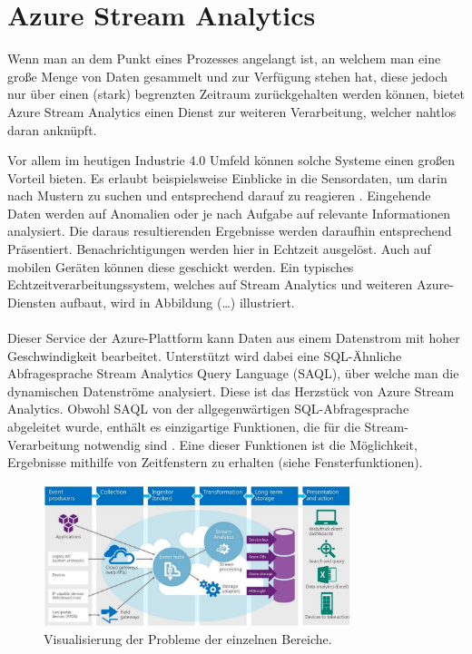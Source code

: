 \section{Azure Stream Analytics}
Wenn man an dem Punkt eines Prozesses angelangt ist, an welchem man eine große Menge von Daten gesammelt und zur Verfügung stehen hat, diese jedoch nur über einen (stark) begrenzten Zeitraum zurückgehalten werden können, bietet Azure Stream Analytics einen Dienst zur weiteren Verarbeitung, welcher nahtlos daran anknüpft. 


Vor allem im heutigen Industrie 4.0 Umfeld können solche Systeme einen großen Vorteil bieten. Es erlaubt beispielsweise Einblicke in die Sensordaten, um darin nach Mustern zu suchen und entsprechend darauf zu reagieren \cite{Klein.2017}. Eingehende Daten werden auf Anomalien oder je nach Aufgabe auf relevante Informationen analysiert. Die daraus resultierenden Ergebnisse werden daraufhin entsprechend Präsentiert. Benachrichtigungen werden hier in Echtzeit ausgelöst. Auch auf mobilen Geräten können diese geschickt werden. Ein typisches Echtzeitverarbeitungssystem, welches auf Stream Analytics und weiteren Azure-Diensten aufbaut, wird in Abbildung (…) illustriert.\\ \\
Dieser Service der Azure-Plattform kann Daten aus einem Datenstrom mit hoher Geschwindigkeit bearbeitet. Unterstützt wird dabei eine SQL-Ähnliche Abfragesprache Stream Analytics Query Language (SAQL), über welche man die dynamischen Datenströme analysiert. Diese ist das Herzstück von Azure Stream Analytics. Obwohl SAQL von der allgegenwärtigen SQL-Abfragesprache abgeleitet wurde, enthält es einzigartige Funktionen, die für die Stream-Verarbeitung notwendig sind \cite{Prosise.}. Eine dieser Funktionen ist die Möglichkeit, Ergebnisse mithilfe von Zeitfenstern zu erhalten (siehe Fensterfunktionen). 
\begin{figure}[ht]
	\centering
	\includegraphics[width=0.8\textwidth,]{images/StreamAnalytics}
	\caption{Visualisierung der Probleme der einzelnen Bereiche\cite{Laukkanen.2017}.}
	\label{studie}
\end{figure}
